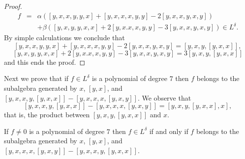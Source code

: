 \documentclass{cimart}
\begin{document}
\begin{proof}
\begin{eqnarray*}
f &=& \alpha([y, x, x, y, y, x] + [y, x, x, x, y, y] -2[y, x, x, y, x, y])\\
& &+ \beta ([y, x, y, y, x, x] + 2[y, x. x, x, y, y] - 3[y, x, x, y, x, y]) \in L^\delta.
\end{eqnarray*}
By simple calculations we conclude that 
$$[y, x, x, y, y, x] + [y, x, x, x, y, y] -2[y, x, x, y, x, y] = [y, x, y, [y, x, x]],$$ 
$$[y, x, y, y, x, x] + 2[y, x. x, x, y, y] - 3[y, x, x, y, x, y] = 3[y, x, y, [y, x, x]]$$
and this ends the proof.
\end{proof}

Next we prove that if $f \in L^\delta$  is a polynomial of degree $7$ then $f $ belongs to the subalgebra generated by  $x$, $[y, x]$, and $[y, x, x, y, [y, x, x]] - [y, x, x, x, [y, x, y]]$. We observe that $$[y, x, x, y, [y, x, x]] - [y, x, x, x, [y, x, y]] = [y, x, y, [y, x, x], x],$$ that is, the product between $[y, x, y, [y, x, x]]$ and $x$.

\begin{proposition}If $f \ne 0$ is a polynomial of degree $7$  then $f \in L^\delta$ if and only if $f $ belongs to the subalgebra generated by $x$, $[y, x]$, and $[y, x, x, x, [y, x, y]] - [y, x, x, y, [y, x, x]]$.
\end{proposition}
\end{document}
